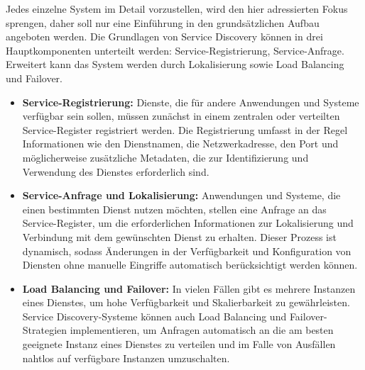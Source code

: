 \documentclass[../vs-script-first-v01.tex]{subfiles}
\begin{document}
Jedes einzelne System im Detail vorzustellen, wird den hier adressierten Fokus sprengen, daher soll nur eine Einführung in den grundsätzlichen Aufbau angeboten werden. 
Die Grundlagen von Service Discovery können in drei Hauptkomponenten unterteilt werden: Service-Registrierung, Service-Anfrage. Erweitert kann das System werden durch Lokalisierung sowie Load Balancing und Failover.
\begin{itemize}
\item \textbf{Service-Registrierung:} Dienste, die für andere Anwendungen und Systeme verfügbar sein sollen, müssen zunächst in einem zentralen oder verteilten Service-Register registriert werden. Die Registrierung umfasst in der Regel Informationen wie den Dienstnamen, die Netzwerkadresse, den Port und möglicherweise zusätzliche Metadaten, die zur Identifizierung und Verwendung des Dienstes erforderlich sind.
\item \textbf{Service-Anfrage und Lokalisierung:} Anwendungen und Systeme, die einen bestimmten Dienst nutzen möchten, stellen eine Anfrage an das Service-Register, um die erforderlichen Informationen zur Lokalisierung und Verbindung mit dem gewünschten Dienst zu erhalten. Dieser Prozess ist dynamisch, sodass Änderungen in der Verfügbarkeit und Konfiguration von Diensten ohne manuelle Eingriffe automatisch berücksichtigt werden können.
\item \textbf{Load Balancing und Failover:} In vielen Fällen gibt es mehrere Instanzen eines Dienstes, um hohe Verfügbarkeit und Skalierbarkeit zu gewährleisten. Service Discovery-Systeme können auch Load Balancing und Failover-Strategien implementieren, um Anfragen automatisch an die am besten geeignete Instanz eines Dienstes zu verteilen und im Falle von Ausfällen nahtlos auf verfügbare Instanzen umzuschalten.
\end{itemize}    
\end{document}
